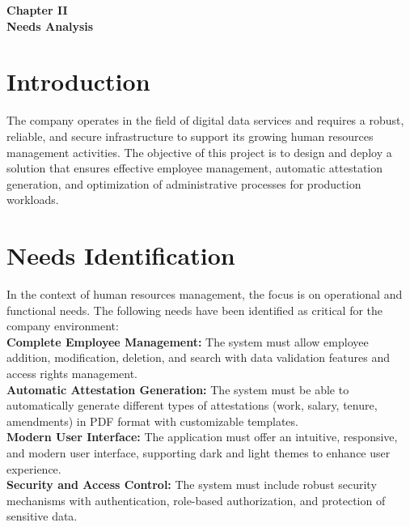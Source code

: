 \documentclass[a4paper,12pt]{report}
\begin{document}
\setcounter{chapter}{2}
\begin{doublespace}
{}
\vspace*{10cm}
\centering
\textbf{ \huge Chapter II \\ [1 cm] Needs Analysis}
\end{doublespace}
\setcounter{section}{0}
\cleardoublepage
\fancyhead[R]{\nouppercase{\rightmark}}
\begin{doublespace}
\section{Introduction}
\hspace{1cm}The company operates in the field of digital data services and requires a robust, reliable, and secure infrastructure to support its growing human resources management activities. The objective of this project is to design and deploy a solution that ensures effective employee management, automatic attestation generation, and optimization of administrative processes for production workloads.

\section{Needs Identification}
\hspace{1cm}In the context of human resources management, the focus is on operational and functional needs. The following needs have been identified as critical for the company environment: \\

\textbf{Complete Employee Management:}  
The system must allow employee addition, modification, deletion, and search with data validation features and access rights management. \\

\textbf{Automatic Attestation Generation:}  
The system must be able to automatically generate different types of attestations (work, salary, tenure, amendments) in PDF format with customizable templates. \\

\textbf{Modern User Interface:}  
The application must offer an intuitive, responsive, and modern user interface, supporting dark and light themes to enhance user experience. \\

\textbf{Security and Access Control:}  
The system must include robust security mechanisms with authentication, role-based authorization, and protection of sensitive data. \\


\end{doublespace}
\end{document}
